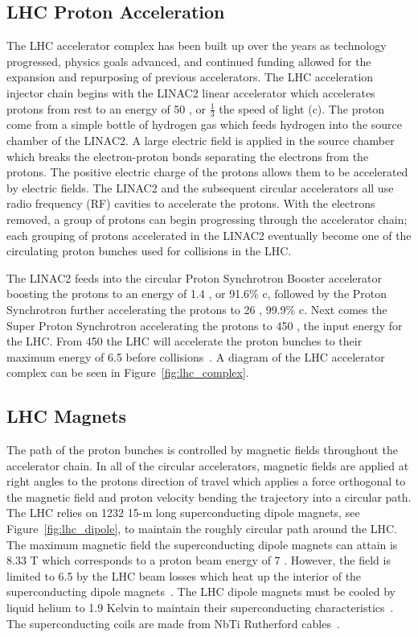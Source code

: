 \subsection{LHC Proton Acceleration}
The LHC accelerator complex has been built up over the years as technology progressed,
physics goals advanced, and continued funding allowed for the expansion and repurposing
of previous accelerators. The LHC acceleration injector chain begins with the LINAC2 linear
accelerator which accelerates protons from rest to an energy of 50 \MeV, 
or $\frac{1}{3}$ the speed of light (c).
The proton come from a simple bottle of hydrogen gas which feeds hydrogen
into the source chamber of the LINAC2. A large electric field is applied in the source
chamber which breaks the electron-proton bonds separating the electrons from the protons.
The positive electric charge of the protons allows them to be accelerated by electric
fields. The LINAC2 and the subsequent circular accelerators all use radio frequency (RF)
cavities to accelerate the protons.
With the electrons removed, a group of protons can begin progressing through the accelerator
chain; each grouping of protons accelerated in the LINAC2 eventually become one of the 
circulating proton bunches used for collisions in the LHC.

The LINAC2 feeds into the circular Proton Synchrotron Booster accelerator boosting
the protons to an energy of 1.4 \GeV, or 91.6\% c, followed by the Proton Synchrotron further
accelerating the protons to 26 \GeV, 99.9\% c. Next comes the Super Proton Synchrotron
accelerating the protons to 450 \GeV, the input energy for the LHC. From 450 \GeV the LHC 
will accelerate the proton bunches to their maximum energy of 6.5 \TeV before 
collisions~\cite{Voss:2009zz}.
A diagram of the LHC accelerator complex can be seen in Figure~\ref{fig:lhc_complex}.



\subsection{LHC Magnets}
The path of the proton bunches is controlled by magnetic fields throughout
the accelerator chain. In all of the circular accelerators, magnetic fields are applied
at right angles to the protons direction of travel which applies a force orthogonal to
the magnetic field and proton velocity bending the trajectory into a circular path. The LHC
relies on 1232 15-m long superconducting dipole magnets, see Figure~\ref{fig:lhc_dipole},
to maintain the roughly circular path around the LHC.
The maximum magnetic field the superconducting dipole magnets can attain is 8.33 T which
corresponds to a proton beam energy of 7 \TeV. However, the field is limited to 6.5 \TeV by the LHC
beam losses which heat up the interior of the superconducting dipole magnets~\cite{Voss:2009zz}.
The LHC dipole magnets must be cooled by liquid helium to 1.9 Kelvin to maintain their superconducting
characteristics~\cite{lhc_magnets}. The superconducting coils are made from NbTi Rutherford
cables~\cite{1018583}.

